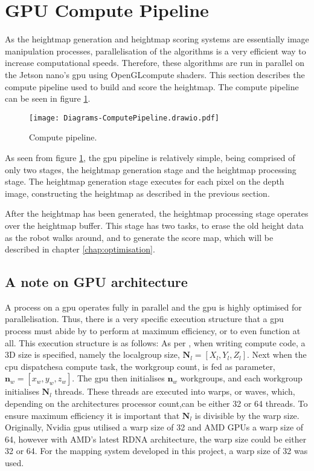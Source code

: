     \section{GPU Compute Pipeline}
        As the heightmap generation and heightmap scoring systems are essentially image manipulation processes, parallelisation of the algorithms is a very efficient way to increase computational speeds. Therefore, these algorithms are run in parallel on the Jetson nano's \ac{gpu} using OpenGLcompute shaders. This section describes the compute pipeline used to build and score the heightmap. The compute pipeline can be seen in figure \ref{fig:compute_pipe}.
        \begin{figure}[h]
            \centering
            \texttt{[image: Diagrams-ComputePipeline.drawio.pdf]}
            \caption{Compute pipeline.}
            \label{fig:compute_pipe}
        \end{figure}
    
        \noindent
        As seen from figure \ref{fig:compute_pipe}, the \ac{gpu} pipeline is relatively simple, being comprised of only two stages, the heightmap generation stage and the heightmap processing stage. The heightmap generation stage executes for each pixel on the depth image, constructing the heightmap as described in the previous section.
        
        After the heightmap has been generated, the heightmap processing stage operates over the heightmap buffer. This stage has two tasks, to erase the old height data as the robot walks around, and to generate the score map, which will be described in chapter \ref{chap:optimisation}.
        
        \newpage
        \subsection{A note on GPU architecture}
            A process on a \ac{gpu} operates fully in parallel and the \ac{gpu} is highly optimised for parallelisation. Thus, there is a very specific execution structure that a \ac{gpu} process must abide by to perform at maximum efficiency, or to even function at all. This execution structure is as follows: As per \cite{nvidia_doc}, when writing compute code, a 3D size is specified, namely the localgroup size, \(\bm{N}_{l} = [X_l,Y_{l},Z_{l}]\). Next when the \ac{cpu} dispatchesa compute task, the workgroup count, is fed as parameter, \(\bm{n}_{w} = [x_{w},y_{w},z_{w}]\). The \ac{gpu} then initialises \(\bm{n}_w\) workgroups, and each workgroup initialises \(\bm{N}_l\) threads. These threads are executed into warps, or waves, which, depending on the architectures processor count,can be either 32 or 64 threads. To ensure maximum efficiency it is important that \(\bm{N}_l\) is divisible by the warp size.
            Originally, Nvidia \ac{gpu}s utilised a warp size of 32 and AMD GPUs a warp size of 64, however with AMD's latest RDNA architecture, the warp size could be either 32 or 64. For the mapping system developed in this project, a warp size of 32 was used.
            
